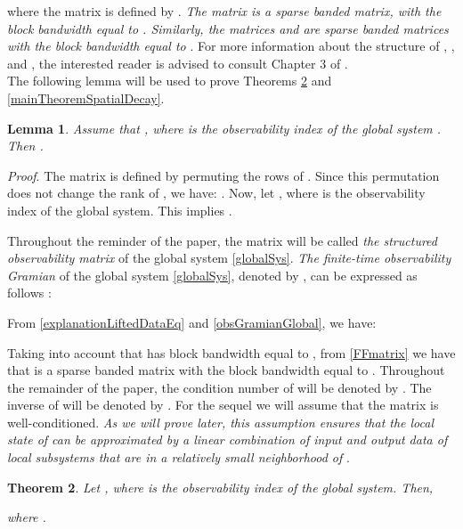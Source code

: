 \documentclass[journal,10pt]{IEEEtran}
\newtheorem{thm}{Theorem}[section]
\newtheorem{lemma}[thm]{Lemma}
\begin{document}
\begin{small}

\end{small}
where the matrix  is defined by . \textit{The matrix  is a sparse banded matrix, with the block bandwidth equal to . Similarly, the matrices  and  are sparse banded matrices with the block bandwidth equal to }. For more information about the structure of , , and , the interested reader is advised to consult Chapter 3 of \cite{haberThesis}.
\\
The following lemma will be used to prove Theorems \ref{stateEstimatorLemma} and \ref{mainTheoremSpatialDecay}. \\
\begin{lemma}
Assume that , where  is the observability index of the global system \cite{luenberger1971,haber2013mhe}. Then .
\label{observabilityTheorem}  \\
\end{lemma}
\textit{Proof}. 
The matrix  is defined by permuting the rows of . Since this permutation does not change the rank of , we have: . Now, let , where  is the observability index of the global system. This implies .  
\\ \par
Throughout the reminder of the paper, the matrix  will be called \textit{the structured observability matrix} of the global system \eqref{globalSys}. \textit{The finite-time observability Gramian} of the global system \eqref{globalSys}, denoted by , can be expressed as follows \cite{lim1996hankel,antoulas2005approximation}:
\begin{small}

\end{small} 
From \eqref{explanationLiftedDataEq} and \eqref{obsGramianGlobal}, we have:
\begin{small}

\end{small}
Taking into account that  has block bandwidth equal to , from \eqref{FFmatrix} we have that  is a sparse banded matrix with the block bandwidth equal to . Throughout the remainder of the paper, the condition number of  will be denoted by . The inverse of  will be denoted by . For the sequel we will assume that the matrix  is well-conditioned. \textit{As we will prove later, this assumption ensures that the local state of  can be approximated by a linear combination of input and output data of local subsystems that are in a relatively small neighborhood of }. \\
\begin{thm}
Let , where  is the observability index of the global system. Then,
\begin{small} 

\end{small}
\label{stateEstimatorLemma}
where .
\end{thm}
\end{document}
